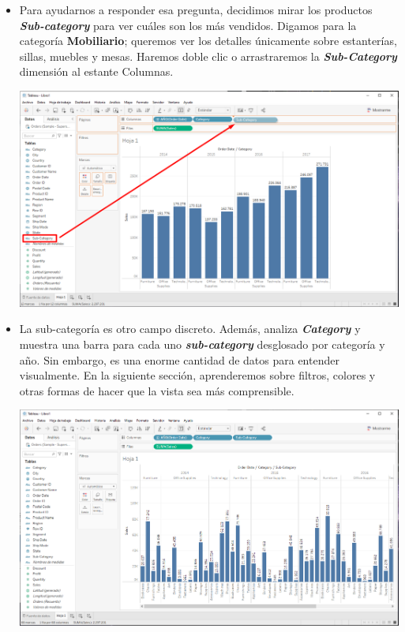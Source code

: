 \documentclass[12pt,letterpaper]{article}
\begin{document}
\begin{enumerate}
\begin{center}
        \end{center}
        \begin{itemize}
            \item Para ayudarnos a responder esa pregunta, decidimos mirar los productos \textit{\textbf{Sub-category}} para ver cuáles son los más vendidos. Digamos para la categoría \textbf{Mobiliario}; queremos ver los detalles únicamente sobre estanterías, sillas, muebles y mesas. Haremos doble clic o arrastraremos la \textit{\textbf{Sub-Category}} dimensión al estante Columnas.
            \begin{center}
                \includegraphics[width=15cm]{./img/img17.png}
            \end{center}
            \item La sub-categoría es otro campo discreto. Además, analiza \textit{\textbf{Category}} y muestra una barra para cada uno \textit{\textbf{sub-category}} desglosado por categoría y año. Sin embargo, es una enorme cantidad de datos para entender visualmente. En la siguiente sección, aprenderemos sobre filtros, colores y otras formas de hacer que la vista sea más comprensible.
            \begin{center}
                \includegraphics[width=15cm]{./img/img18.png}
            \end{center}
        \end{itemize}
    \end{enumerate}
\end{document}
